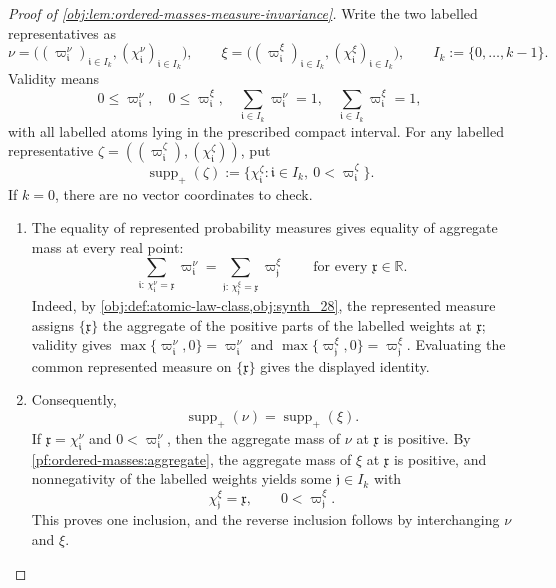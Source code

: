 \begin{proof}[Proof of \cref{obj:lem:ordered-masses-measure-invariance}]
Write the two labelled representatives as
\[
\nu=\bigl((\varpi^\nu_{\mathfrak i})_{\mathfrak i\in I_k},
(\chi^\nu_{\mathfrak i})_{\mathfrak i\in I_k}\bigr),
\qquad
\xi=\bigl((\varpi^\xi_{\mathfrak i})_{\mathfrak i\in I_k},
(\chi^\xi_{\mathfrak i})_{\mathfrak i\in I_k}\bigr),
\qquad
I_k:=\{0,\ldots,k-1\}.
\]
Validity means
\[
0\le \varpi^\nu_{\mathfrak i},\quad
0\le \varpi^\xi_{\mathfrak i},\quad
\sum_{\mathfrak i\in I_k}\varpi^\nu_{\mathfrak i}=1,\quad
\sum_{\mathfrak i\in I_k}\varpi^\xi_{\mathfrak i}=1,
\]
with all labelled atoms lying in the prescribed compact interval.  For any labelled representative
\(\zeta=((\varpi^\zeta_{\mathfrak i}),(\chi^\zeta_{\mathfrak i}))\), put
\[
\operatorname{supp}_+(\zeta)
:=
\{\chi^\zeta_{\mathfrak i}:\mathfrak i\in I_k,\ 0<\varpi^\zeta_{\mathfrak i}\}.
\]
If \(k=0\), there are no vector coordinates to check.

\begin{enumerate}
\item\label{pf:ordered-masses:aggregate}
The equality of represented probability measures gives equality of aggregate mass at every real point:
\[
\sum_{\mathfrak i:\,\chi^\nu_{\mathfrak i}=\mathfrak x}\varpi^\nu_{\mathfrak i}
=
\sum_{\mathfrak j:\,\chi^\xi_{\mathfrak j}=\mathfrak x}\varpi^\xi_{\mathfrak j}
\qquad\text{for every }\mathfrak x\in\mathbb R .
\]
Indeed, by \cref{obj:def:atomic-law-class,obj:synth_28}, the represented measure assigns \(\{\mathfrak x\}\) the aggregate of the positive parts of the labelled weights at \(\mathfrak x\); validity gives \(\max\{\varpi^\nu_{\mathfrak i},0\}=\varpi^\nu_{\mathfrak i}\) and \(\max\{\varpi^\xi_{\mathfrak j},0\}=\varpi^\xi_{\mathfrak j}\).  Evaluating the common represented measure on \(\{\mathfrak x\}\) gives the displayed identity.

\item\label{pf:ordered-masses:support}
Consequently,
\[
\operatorname{supp}_+(\nu)=\operatorname{supp}_+(\xi).
\]
If \(\mathfrak x=\chi^\nu_{\mathfrak i}\) and \(0<\varpi^\nu_{\mathfrak i}\), then the aggregate mass of \(\nu\) at \(\mathfrak x\) is positive.  By \cref{pf:ordered-masses:aggregate}, the aggregate mass of \(\xi\) at \(\mathfrak x\) is positive, and nonnegativity of the labelled weights yields some \(\mathfrak j\in I_k\) with
\[
\chi^\xi_{\mathfrak j}=\mathfrak x,
\qquad
0<\varpi^\xi_{\mathfrak j}.
\]
This proves one inclusion, and the reverse inclusion follows by interchanging \(\nu\) and \(\xi\).


\end{enumerate}
\end{proof}
